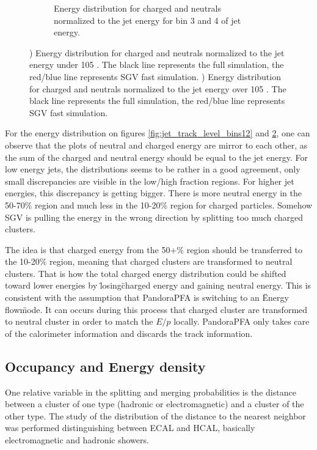 \begin{figure}[htbp!]
\begin{subfigure}[t]{0.45\textwidth}
    \caption{Energy distribution for charged and neutrals normalized to the jet energy for bin 3 and 4 of jet energy.} \label{fig:jet_track_level_bins34}
  \end{subfigure}
  \caption{) Energy distribution for charged and neutrals normalized to the jet energy under 105 \GeV. The black line represents the full simulation, the red/blue line represents SGV fast simulation. ) Energy distribution for charged and neutrals normalized to the jet energy over 105 \GeV. The black line represents the full simulation, the red/blue line represents SGV fast simulation.}
\end{figure}

For the energy distribution on figures \ref{fig:jet_track_level_bins12} and \ref{fig:jet_track_level_bins34}, one can observe that the plots of neutral and charged energy are mirror to each other, as the sum of the charged and neutral energy should be equal to the jet energy. For low energy jets, the distributions seems to be rather in a good agreement, only small discrepancies are visible in the low/high fraction regions. For higher jet energies, this discrepancy is getting bigger. There is more neutral energy in the 50-70\% region and much less in the 10-20\% region for charged particles. Somehow SGV is pulling the energy in the wrong direction by splitting too much charged clusters.

The idea is that charged energy from the 50+\% region should be transferred to the 10-20\% region, meaning that charged clusters are transformed to neutral clusters. That is how the total charged energy distribution could be shifted toward lower energies by \"losing\" charged energy and gaining neutral energy. This is consistent with the assumption that PandoraPFA is switching to an \"Energy flow\" mode. It can occurs during this process that charged cluster are transformed to neutral cluster in order to match the $E/p$ locally. PandoraPFA only takes care of the calorimeter information and discards the track information.

\subsection{Occupancy and Energy density}

One relative variable in the splitting and merging probabilities is the distance between a cluster of one type (hadronic or electromagnetic) and a cluster of the other type. The study of the distribution of the distance to the nearest neighbor was performed distinguishing between ECAL and HCAL, basically electromagnetic and hadronic showers.

